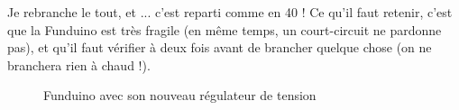 Je rebranche le tout, et ... c'est reparti comme en 40 ! Ce qu'il faut retenir, c'est %
que la Funduino est très fragile (en même temps, un court-circuit ne pardonne pas), %
et qu'il faut vérifier à deux fois avant de brancher quelque chose (on ne branchera %
rien à chaud !).%
\begin{figure}%
   \caption{\label{funduino_repared} Funduino avec son nouveau régulateur de tension}%
\end{figure}%